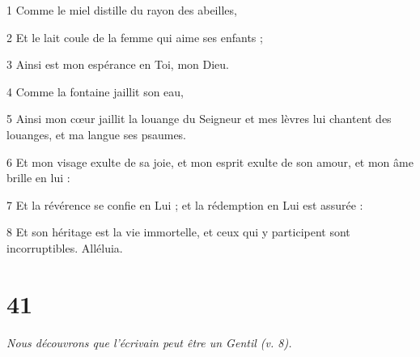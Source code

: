\par 1 Comme le miel distille du rayon des abeilles,
\par 2 Et le lait coule de la femme qui aime ses enfants ;
\par 3 Ainsi est mon espérance en Toi, mon Dieu.
\par 4 Comme la fontaine jaillit son eau,
\par 5 Ainsi mon cœur jaillit la louange du Seigneur et mes lèvres lui chantent des louanges, et ma langue ses psaumes.
\par 6 Et mon visage exulte de sa joie, et mon esprit exulte de son amour, et mon âme brille en lui :
\par 7 Et la révérence se confie en Lui ; et la rédemption en Lui est assurée :
\par 8 Et son héritage est la vie immortelle, et ceux qui y participent sont incorruptibles. Alléluia.

\chapter{41}

\par \textit{Nous découvrons que l'écrivain peut être un Gentil (v. 8).}

